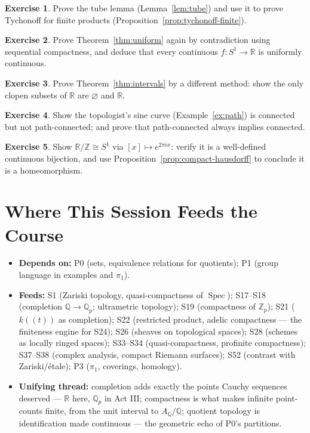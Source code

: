 \documentclass[11pt,a4paper]{article}
\theoremstyle{definition}
\newtheorem{exercise}{Exercise}
\newcommand{\R}{\mathbb{R}}
\newcommand{\Z}{\mathbb{Z}}
\newcommand{\Q}{\mathbb{Q}}
\newcommand{\Spec}{\operatorname{Spec}}
\begin{document}
	\begin{exercise}
		Prove the tube lemma (Lemma~\ref{lem:tube}) and use it to prove Tychonoff for finite products
		(Proposition~\ref{prop:tychonoff-finite}).
	\end{exercise}
	\begin{exercise}
		Prove Theorem~\ref{thm:uniform} again by contradiction using sequential compactness, and deduce that
		every continuous $f:S^1\to\R$ is uniformly continuous.
	\end{exercise}
	\begin{exercise}
		Prove Theorem~\ref{thm:intervals} by a different method: show the only clopen subsets of $\R$ are
		$\varnothing$ and $\R$.
	\end{exercise}
	\begin{exercise}
		Show the topologist's sine curve (Example~\ref{ex:path}) is connected but not path-connected; and prove
		that path-connected always implies connected.
	\end{exercise}
	\begin{exercise}
		Show $\R/\Z\cong S^1$ via $[x]\mapsto e^{2\pi ix}$: verify it is a well-defined continuous bijection, and
		use Proposition~\ref{prop:compact-hausdorff} to conclude it is a homeomorphism.
	\end{exercise}
	
	\section*{Where This Session Feeds the Course}
	\begin{itemize}
		\item \textbf{Depends on:} P0 (sets, equivalence relations for quotients); P1 (group language in examples and $\pi_1$).
		\item \textbf{Feeds:} S1 (Zariski topology, quasi-compactness of $\Spec$); S17--S18 (completion
		$\Q\to\Q_p$; ultrametric topology); S19 (compactness of $\Z_p$); S21 ($k((t))$ as completion);
		S22 (restricted product, adelic compactness --- the finiteness engine for S24); S26 (sheaves on
		topological spaces); S28 (schemes as locally ringed spaces); S33--S34 (quasi-compactness, profinite
		compactness); S37--S38 (complex analysis, compact Riemann surfaces); S52 (contrast with Zariski/\'etale); P3 ($\pi_1$, coverings, homology).
		\item \textbf{Unifying thread:} completion adds exactly the points Cauchy sequences deserved --- $\R$
		here, $\Q_p$ in Act III; compactness is what makes infinite point-counts finite, from the unit
		interval to $A_\Q/\Q$; quotient topology is identification made continuous --- the geometric echo
		of P0's partitions.
	\end{itemize}
	
\end{document}
